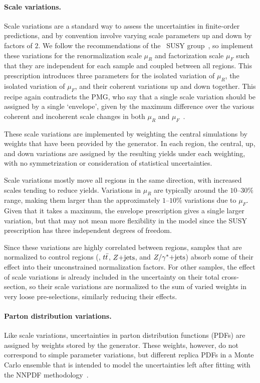 \paragraph{Scale variations.}
Scale variations are a standard way to assess the uncertainties in finite-order
predictions, and by convention involve varying scale parameters up and down
by factors of $2$.
We follow the recommendations of the
\atlas\ SUSY group~\cite{atlas_twiki_susytheoretical}, so implement
these variations for the
renormalization scale $\mu_R$ and factorization scale $\mu_F$ such that they
are independent for each sample and coupled between all regions.
This prescription introduces three parameters for the isolated variation of
$\mu_R$, the isolated variation of $\mu_F$, and their coherent variations
up and down together.
This recipe again contradicts the PMG, who say
that a single scale variation should be assigned by a single `envelope',
given by the maximum difference over the various coherent and incoherent scale
changes in both $\mu_R$ and $\mu_F$~\cite{atlas_twiki_pmg_theory}.

These scale variations are implemented by weighting the central simulations
by weights that have been provided by the generator.
In each region, the central, up, and down variations are assigned by the
resulting yields under each weighting, with no symmetrization or
consideration of statistical uncertainties.

Scale variations mostly move all regions in the same direction, with increased
scales tending to reduce yields.
Variations in $\mu_R$ are typically around the $10\textrm{--}30\%$ range,
making them larger than the approximately $1\textrm{--}10\%$ variations due to
$\mu_F$.
Given that it takes a maximum, the envelope prescription gives a single larger
variation, but that may not mean more flexibility in the model since the SUSY
prescription has three independent degrees of freedom.

Since these variations are highly correlated between regions, samples that are
normalized to control regions (\diboson, $t\bar t$, $Z\mathrm{+jets}$, and $Z/\gamma^*\mathrm{+jets}$)
absorb some of their effect into their unconstrained normalization factors.
For other samples, the effect of scale variations is already included in
the uncertainty on their total cross-section, so their scale variations are
normalized to the sum of varied weights in very loose pre-selections,
similarly reducing their effects.

\paragraph{Parton distribution variations.}
Like scale variations, uncertainties in parton distribution functions (PDFs)
are assigned by weights stored by the generator.
These weights, however, do not correspond to simple parameter variations,
but different replica PDFs in a Monte Carlo ensemble
that is intended to model the uncertainties left after fitting with the
\textsc{NNPDF} methodology~\cite{NNPDF:2017mvq,BALL2011112,BALL2012608}.

